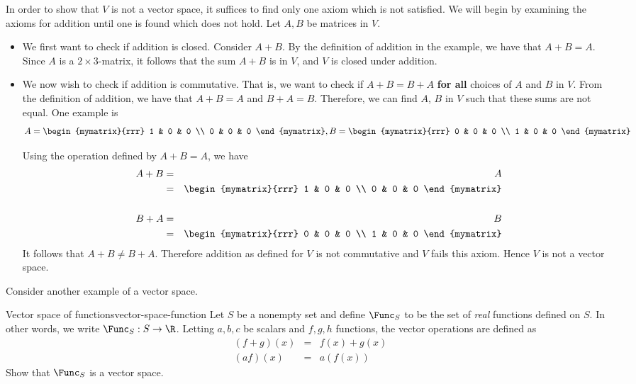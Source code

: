 \begin{solution}
In order to show that $V$ is not a vector space, it suffices to find only one axiom which is not satisfied. We will begin by examining the axioms for addition until one is found which does not hold. Let $A,B$ be matrices in $V$. 

\begin{itemize}
\item
We first want to check if addition is closed. Consider $A+B$. By the definition of addition in the example, we have that $A+B = A$. Since $A$ is a $2 \times 3$-matrix, it follows that the sum $A+B$ is in $V$, and $V$ is closed under addition. 

\item
We now wish to check if addition is commutative. That is, we want to check if $A + B = B + A$ \textbf{for all} choices of $A$ and $B$ in $V$. From the definition of addition, we have that $A + B = A$ and $B + A = B$. Therefore, we can find $A$, $B$ in $V$ such that these sums are not equal. One example is 
\[
A = \begin{mymatrix}{rrr}
1 & 0 & 0 \\
0 & 0 & 0 
\end{mymatrix}, B = \begin{mymatrix}{rrr}
0 & 0 & 0 \\
1 & 0 & 0 
\end{mymatrix}
\]

Using the operation defined by $A+B=A$, we have 
\begin{eqnarray*}
A+B &=& A \\
&=& \begin{mymatrix}{rrr}
1 & 0 & 0 \\
0 & 0 & 0 
\end{mymatrix} \\
\\
B+A &=& B \\
&=& \begin{mymatrix}{rrr}
0 & 0 & 0 \\
1 & 0 & 0 
\end{mymatrix}
\end{eqnarray*}
It follows that $A+B \neq B+A$. Therefore addition as defined for $V$ is not commutative and $V$ fails this axiom. Hence $V$ is not a vector space.
\end{itemize}
\end{solution}

Consider another example of a vector space. 

\begin{example}{Vector space of functions}{vector-space-function}
Let $S$ be a nonempty set and define $\Func_S$ to be the set of \textit{real} functions
defined on $S$. In other words, we write $\Func_S: S \to \R$. Letting $a,b,c$ be scalars and $f,g,h$ functions, the
vector operations are defined as
\begin{eqnarray*}
(f+g) (x)  &=&f(x) +g(
x)  \\
(af) (x)  &=&a(f(x))
\end{eqnarray*}
Show that $\Func_S$ is a vector space. 
\end{example}

